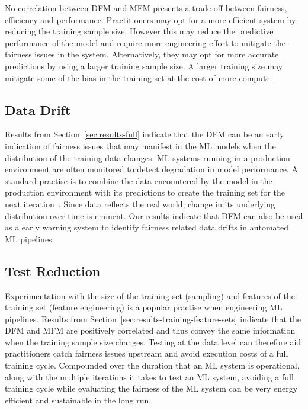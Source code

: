 \documentclass{article}
\begin{document}
No correlation between DFM and MFM presents a trade-off between
fairness, efficiency and performance. Practitioners may opt for a more
efficient system by reducing the training sample size. However this
may reduce the predictive performance of the model and require more
engineering effort to mitigate the fairness issues in the system.
Alternatively, they may opt for more accurate predictions by using a
larger training sample size. A larger training size may mitigate some
of the bias in the training set at the cost of more compute.

\subsection{Data Drift}\label{sec:discuss-data-drift}

Results from Section \ref{sec:results-full} indicate that the DFM can
be an early indication of fairness issues that may manifest in the ML
models when the distribution of the training data changes. ML systems
running in a production environment are often monitored to detect
degradation in model performance. A standard practise is to combine
the data encountered by the model in the production environment with
its predictions to create the training set for the next
iteration \cite{biessmann2021automated,breck2019data,schelter2018automating}. Since
data reflects the real world, change in its underlying distribution
over time is eminent. Our results indicate that DFM can also be used
as a early warning system to identify fairness related data drifts in
automated ML pipelines.

\subsection{Test Reduction}\label{sec:discuss-test-red}

Experimentation with the size of the training set (sampling) and
features of the training set (feature engineering) is a popular
practise when engineering ML pipelines. Results from
Section \ref{sec:results-training-feature-sets} indicate that the DFM
and MFM are positively correlated and thus convey the same information
when the training sample size changes. Testing at the data level can
therefore aid practitioners catch fairness issues upstream and avoid
execution costs of a full training cycle. Compounded over the duration
that an ML system is operational, along with the multiple iterations
it takes to test an ML system, avoiding a full training cycle while
evaluating the fairness of the ML system can be very energy efficient
and sustainable in the long run.
\end{document}
